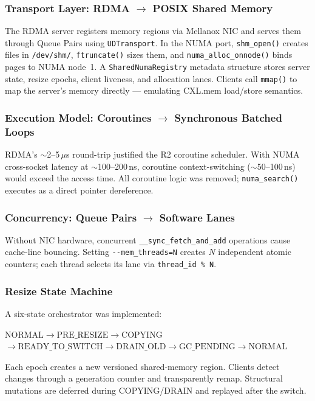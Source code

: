 \documentclass[conference]{IEEEtran}
\begin{document}
\subsubsection{Transport Layer: RDMA $\to$ POSIX Shared Memory}
The RDMA server registers memory regions via Mellanox NIC and serves them through Queue Pairs using \texttt{UDTransport}. In the NUMA port, \texttt{shm\_open()} creates files in \texttt{/dev/shm/}, \texttt{ftruncate()} sizes them, and \texttt{numa\_alloc\_onnode()} binds pages to NUMA node~1. A \texttt{SharedNumaRegistry} metadata structure stores server state, resize epochs, client liveness, and allocation lanes. Clients call \texttt{mmap()} to map the server's memory directly --- emulating CXL.mem load/store semantics.

\subsubsection{Execution Model: Coroutines $\to$ Synchronous Batched Loops}
RDMA's $\sim$2--5\,$\mu$s round-trip justified the R2 coroutine scheduler. With NUMA cross-socket latency at $\sim$100--200\,ns, coroutine context-switching ($\sim$50--100\,ns) would exceed the access time. All coroutine logic was removed; \texttt{numa\_search()} executes as a direct pointer dereference.

\subsubsection{Concurrency: Queue Pairs $\to$ Software Lanes}
Without NIC hardware, concurrent \texttt{\_\_sync\_fetch\_and\_add} operations cause cache-line bouncing. Setting \texttt{-{}-mem\_threads=N} creates $N$ independent atomic counters; each thread selects its lane via \texttt{thread\_id \% N}.

\subsubsection{Resize State Machine}\label{sec:resize-sm}
A six-state orchestrator was implemented:
\begin{center}
\small
$\text{NORMAL} \to \text{PRE\_RESIZE} \to \text{COPYING}$ \\
$\to \text{READY\_TO\_SWITCH} \to \text{DRAIN\_OLD} \to \text{GC\_PENDING} \to \text{NORMAL}$
\end{center}
Each epoch creates a new versioned shared-memory region. Clients detect changes through a generation counter and transparently remap. Structural mutations are deferred during COPYING/DRAIN and replayed after the switch.
\end{document}
